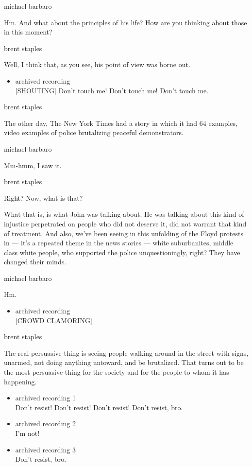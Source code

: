 michael barbaro

Hm. And what about the principles of his life? How are you thinking
about those in this moment?

brent staples

Well, I think that, as you see, his point of view was borne out.

\begin{itemize}
\tightlist
\item
  archived recording\\
  {[}SHOUTING{]} Don't touch me! Don't touch me! Don't touch me.
\end{itemize}

brent staples

The other day, The New York Times had a story in which it had 64
examples, video examples of police brutalizing peaceful demonstrators.

michael barbaro

Mm-hmm, I saw it.

brent staples

Right? Now, what is that?

What that is, is what John was talking about. He was talking about this
kind of injustice perpetrated on people who did not deserve it, did not
warrant that kind of treatment. And also, we've been seeing in this
unfolding of the Floyd protests in --- it's a repeated theme in the news
stories --- white suburbanites, middle class white people, who supported
the police unquestioningly, right? They have changed their minds.

michael barbaro

Hm.

\begin{itemize}
\tightlist
\item
  archived recording\\
  {[}CROWD CLAMORING{]}
\end{itemize}

brent staples

The real persuasive thing is seeing people walking around in the street
with signs, unarmed, not doing anything untoward, and be brutalized.
That turns out to be the most persuasive thing for the society and for
the people to whom it has happening.

\begin{itemize}
\item
  archived recording 1\\
  Don't resist! Don't resist! Don't resist! Don't resist, bro.
\item
  archived recording 2\\
  I'm not!
\item
  archived recording 3\\
  Don't resist, bro.
\end{itemize}

